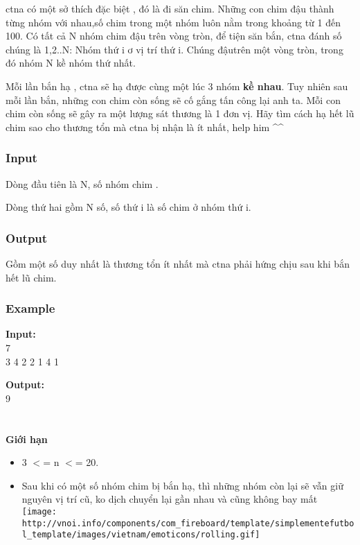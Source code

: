 

ctna có một sở thích đặc biệt , đó là đi săn chim. Những con chim đậu thành từng nhóm với nhau,số chim trong một nhóm luôn nằm trong khoảng từ 1 đến 100. Có tất cả N nhóm chim đậu trên vòng tròn, để tiện săn bắn, ctna đánh số chúng là 1,2..N: Nhóm thứ i ơ vị trí thứ i. Chúng đậutrên một vòng tròn, trong đó nhóm N kề nhóm thứ nhất.

Mỗi lần bắn hạ , ctna sẽ hạ được cùng một lúc 3 nhóm \textbf{ kề nhau}. Tuy nhiên sau mỗi lần bắn, những con chim còn sống sẽ cố gắng tấn công lại anh ta. Mỗi con chim còn sống sẽ gây ra một lượng sát thương là 1 đơn vị. Hãy tìm cách hạ hết lũ chim sao cho thương tổn mà ctna bị nhận là ít nhất, help him \textasciicircum\textasciicircum

\subsubsection{Input}

Dòng đầu tiên là N, số nhóm chim .

Dòng thứ hai gồm N số, số thứ i là số chim ở nhóm thứ i.

\subsubsection{Output}

Gồm một số duy nhất là thương tổn ít nhất mà ctna phải hứng chịu sau khi bắn hết lũ chim.

\subsubsection{Example}

\textbf{Input:}
\\7
\\3 4 2 2 1 4 1

\textbf{Output:}
\\9
\\
\\
\\\textbf{Giới hạn}
\begin{itemize}
	\item 3 $<$= n $<$= 20.
	\item Sau khi có một số nhóm chim bị bắn hạ, thì những nhóm còn lại sẽ vẫn giữ nguyên vị trí cũ, ko dịch chuyển lại gần nhau và cũng không bay mất 
\texttt{[image: http://vnoi.info/components/com\_fireboard/template/simplementefutbol\_template/images/vietnam/emoticons/rolling.gif]}
\end{itemize}